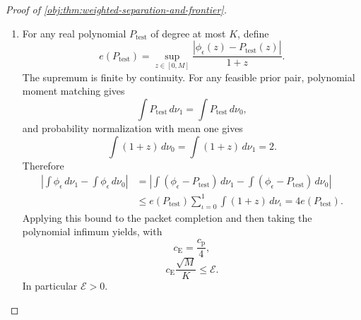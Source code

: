 \begin{proof}[Proof of \cref{obj:thm:weighted-separation-and-frontier}]
\begin{enumerate}
The annihilation and normalization established above give
\[
\int z^\ell\,d\sigma_+
=\int z^\ell\,d\sigma_-,
\qquad \ell=0,\ldots,K,
\]
\[
\int(1+z)\,d(\sigma_++\sigma_-)=1.
\]
Writing, as in \cref{obj:def:weighted-handle},
\[
t=\sigma_+(\mathbb R),
\qquad
u=\int z\,d\sigma_+,
\qquad
z_0=\frac{1-u}{1-t},
\]
the degree-zero and degree-one identities imply
\[
\sigma_-(\mathbb R)=t,
\qquad
\int z\,d\sigma_-=u,
\qquad
t+u=\frac12.
\]
Since \(t,u\ge0\),
\[
0\le t\le\frac12,
\qquad
z_0=\frac{1/2+t}{1-t},
\qquad
\frac12\le z_0\le2\le M.
\]
In particular \(t<1\), so the completion map is defined, and its positive-part coefficient equals \(1-t\). Set
\[
\nu_0=\sigma_-+(1-t)\delta_{z_0},
\qquad
\nu_1=\sigma_++(1-t)\delta_{z_0}.
\]
Their masses and first moments satisfy
\[
\nu_0(\mathbb R)=\nu_1(\mathbb R)=t+(1-t)=1,
\qquad
\int z\,d\nu_0=\int z\,d\nu_1=u+(1-t)z_0=1.
\]
The common atom cancels in every moment difference, so
\[
(\nu_0,\nu_1)\in\mathfrak N_{K,M},
\qquad
\mathscr H^w(\sigma_+,\sigma_-)=(\nu_0,\nu_1).
\]
It also cancels in the target difference:
\[
\begin{aligned}
\int\phi_\epsilon\,d\nu_1-\int\phi_\epsilon\,d\nu_0
&=
\int_{-\pi}^{\pi}
\phi_\epsilon\{z_M(\omega)\}
\frac{H_{K,M}(\omega)}{W_{K,M}}\,
\frac{d\omega}{2\pi}.
\end{aligned}
\]
Hence the explicit completion has gap at least
\(c_{\mathrm p}\sqrt M/K\).

\item
For any real polynomial \(P_{\mathrm{test}}\) of degree at most \(K\), define
\[
e(P_{\mathrm{test}})
=\sup_{z\in[0,M]}
\frac{|\phi_\epsilon(z)-P_{\mathrm{test}}(z)|}{1+z}.
\]
The supremum is finite by continuity. For any feasible prior pair, polynomial moment matching gives
\[
\int P_{\mathrm{test}}\,d\nu_1
=\int P_{\mathrm{test}}\,d\nu_0,
\]
and probability normalization with mean one gives
\[
\int(1+z)\,d\nu_0=\int(1+z)\,d\nu_1=2.
\]
Therefore
\[
\begin{aligned}
\left|\int\phi_\epsilon\,d\nu_1-\int\phi_\epsilon\,d\nu_0\right|
&=
\left|
\int(\phi_\epsilon-P_{\mathrm{test}})\,d\nu_1
-\int(\phi_\epsilon-P_{\mathrm{test}})\,d\nu_0
\right|\\
&\le
e(P_{\mathrm{test}})
\sum_{\iota=0}^1\int(1+z)\,d\nu_\iota
=4e(P_{\mathrm{test}}).
\end{aligned}
\]
Applying this bound to the packet completion and then taking the polynomial infimum yields, with
\[
c_{\mathrm E}=\frac{c_{\mathrm p}}4,
\]
\[
c_{\mathrm E}\frac{\sqrt M}{K}\le\mathcal E.
\]
In particular \(\mathcal E>0\).


\end{enumerate}
\end{proof}
